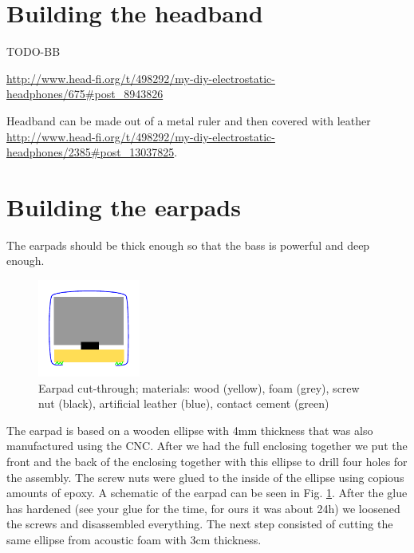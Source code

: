 \documentclass{article}
\begin{document}

\section{Building the headband}
\label{s:headband}
TODO-BB

\url{http://www.head-fi.org/t/498292/my-diy-electrostatic-headphones/675#post_8943826}

Headband can be made out of a metal ruler and then covered with leather \url{http://www.head-fi.org/t/498292/my-diy-electrostatic-headphones/2385#post_13037825}.

\section{Building the earpads}
\label{s:pads}
The earpads should be thick enough so that the bass is powerful and deep enough.
\begin{figure}
\centering
\includegraphics[width=0.3\textwidth]{images/earpad.pdf}
\caption{Earpad cut-through; materials: wood (yellow), foam (grey), screw nut (black), artificial leather (blue), contact cement (green)}
\label{f:pads:cut}
\end{figure}
The earpad is based on a wooden ellipse with 4mm thickness that was also manufactured using the CNC. After we had the full enclosing together we put the front and the back of the enclosing together with this ellipse to drill four holes for the assembly. The screw nuts were glued to the inside of the ellipse using copious amounts of epoxy. A schematic of the earpad can be seen in Fig. \ref{f:pads:cut}. After the glue has hardened (see your glue for the time, for ours it was about 24h) we loosened the screws and disassembled everything. The next step consisted of cutting the same ellipse from acoustic foam with 3cm thickness.
\end{document}
